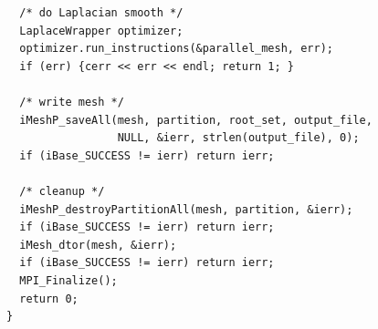 \begin{verbatim}
  /* do Laplacian smooth */
  LaplaceWrapper optimizer;
  optimizer.run_instructions(&parallel_mesh, err);
  if (err) {cerr << err << endl; return 1; }

  /* write mesh */
  iMeshP_saveAll(mesh, partition, root_set, output_file, 
                 NULL, &ierr, strlen(output_file), 0);  
  if (iBase_SUCCESS != ierr) return ierr;
  
  /* cleanup */
  iMeshP_destroyPartitionAll(mesh, partition, &ierr); 
  if (iBase_SUCCESS != ierr) return ierr;
  iMesh_dtor(mesh, &ierr); 
  if (iBase_SUCCESS != ierr) return ierr;
  MPI_Finalize();
  return 0;
}
\end{verbatim}
